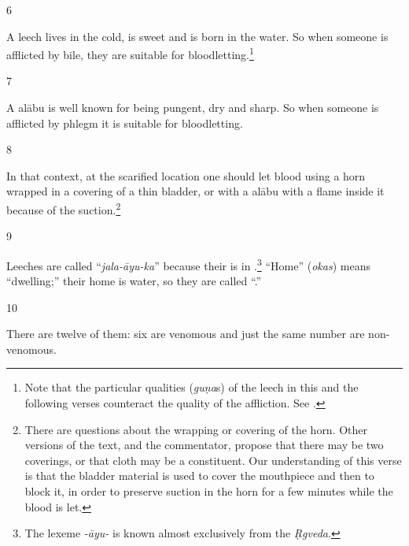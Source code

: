 \begin{translation}
\item[6]

\begin{sloka}
    A leech lives in the cold, is sweet and is born in the water. So when
someone is afflicted by bile, they are suitable for
bloodletting.\footnote{Note that the particular qualities (\emph{guṇa}s) of
    the leech in this and the following verses counteract the quality of the
    affliction.  See \cite[113, table 1]{broo-2018}.}
\end{sloka}

\item[7]

\begin{sloka}
    A \gls{alābu} is well known for being pungent, dry and sharp.  So
when someone is afflicted by phlegm it is suitable for bloodletting.

\end{sloka}
\item[8]

In that context, at the scarified location one should let blood using a horn
wrapped in a covering of a thin bladder, or with a \gls{alābu} with a flame
inside it because of the suction.\footnote{There are questions about the
    wrapping or covering of the horn.  Other versions of the text, and the
    commentator, propose that there may be two coverings, or that cloth may be a
    constituent. 
    Our understanding of this verse is that the
    bladder material is used to cover the mouthpiece and then to block it, in
    order to preserve suction in the horn for a few minutes while the blood is
    let. }

\item[9]

Leeches are called “\emph{jala-āyu-ka}” because their 
is in .\footnote{The lexeme \emph{-āyu-} is known almost 
exclusively from the \emph{Ṛgveda}.} “Home” (\emph{okas}) means 
“{dwelling};” their home is water, so they are called 
“.”

\item[10]

There are twelve of them: six are venomous and just the same number are 
non-venomous. 


\end{translation}
